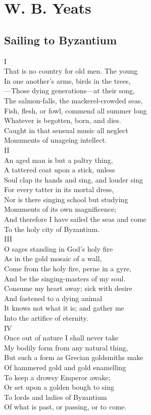 \chapter{W. B. Yeats}
\section{Sailing to Byzantium}

I\\
That is no country for old men. The young\\
In one another's arms, birds in the trees,\\
—Those dying generations—at their song,\\
The salmon-falls, the mackerel-crowded seas,\\
Fish, flesh, or fowl, commend all summer long\\
Whatever is begotten, born, and dies.\\
Caught in that sensual music all neglect\\
Monuments of unageing intellect.\\

II\\
An aged man is but a paltry thing,\\
A tattered coat upon a stick, unless\\
Soul clap its hands and sing, and louder sing\\
For every tatter in its mortal dress,\\
Nor is there singing school but studying\\
Monuments of its own magnificence;\\
And therefore I have sailed the seas and come\\
To the holy city of Byzantium.\\

III\\
O sages standing in God's holy fire\\
As in the gold mosaic of a wall,\\
Come from the holy fire, perne in a gyre,\\
And be the singing-masters of my soul.\\
Consume my heart away; sick with desire\\
And fastened to a dying animal\\
It knows not what it is; and gather me\\
Into the artifice of eternity.\\

IV\\
Once out of nature I shall never take\\
My bodily form from any natural thing,\\
But such a form as Grecian goldsmiths make\\
Of hammered gold and gold enamelling\\
To keep a drowsy Emperor awake;\\
Or set upon a golden bough to sing\\
To lords and ladies of Byzantium\\
Of what is past, or passing, or to come.

